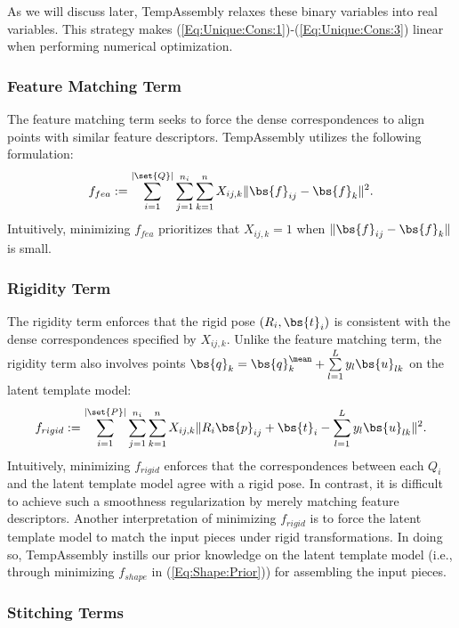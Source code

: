 As we will discuss later, TempAssembly relaxes these binary variables into real variables. This strategy makes (\ref{Eq:Unique:Cons:1})-(\ref{Eq:Unique:Cons:3}) linear when performing numerical optimization. 

\subsubsection{Feature Matching Term}

The feature matching term seeks to force the dense correspondences to align points with similar feature descriptors. TempAssembly utilizes the following formulation:
\begin{equation}
f_{fea} := \sum\limits_{i=1}^{|\set{Q}|}\sum\limits_{j=1}^{n_i} \sum\limits_{k=1}^{n} X_{ij,k}\|\bs{f}_{ij}-\bs{f}_k\|^2.
\label{Eq:Feature:Term}
\end{equation}
Intuitively, minimizing $f_{fea}$ prioritizes that $X_{ij,k}=1$ when $\|\bs{f}_{ij}-\bs{f}_k\|$ is small. 

\subsubsection{Rigidity Term}

The rigidity term enforces that the rigid pose $(R_i,\bs{t}_i)$ is consistent with the dense correspondences specified by $X_{ij,k}$. Unlike the feature matching term, the rigidity term also involves points $\bs{q}_k = \bs{q}_k^{\mean}+\sum\limits_{l=1}^{L}y_l \bs{u}_{lk}$ on the latent template model:
\begin{equation}
f_{rigid}:= \sum\limits_{i=1}^{|\set{P}|}\sum\limits_{j=1}^{n_i}\sum\limits_{k=1}^{n} X_{ij,k} \|R_i\bs{p}_{ij}+\bs{t}_i -\sum\limits_{l=1}^L y_l \bs{u}_{lk}\|^2.
\label{Eq:Rigidity:Term}
\end{equation}
Intuitively, minimizing $f_{rigid}$ enforces that the correspondences between each $Q_i$ and the latent template model agree with a rigid pose. In contrast, it is difficult to achieve such a smoothness regularization by merely matching feature descriptors. Another interpretation of minimizing $f_{rigid}$ is to force the latent template model to match the input pieces under rigid transformations. In doing so, TempAssembly instills our prior knowledge on the latent template model (i.e., through minimizing $f_{shape}$ in (\ref{Eq:Shape:Prior})) for assembling the input pieces. 

\subsubsection{Stitching Terms}

